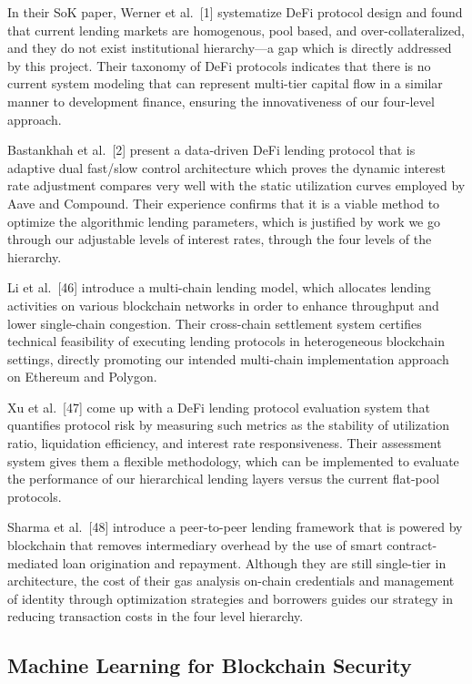 \documentclass[12pt,a4paper]{report}
\begin{document}
In their SoK paper, Werner et al.~[1] systematize DeFi protocol design and found that current lending markets are homogenous, pool based, and over-collateralized, and they do not exist institutional hierarchy---a gap which is directly addressed by this project. Their taxonomy of DeFi protocols indicates that there is no current system modeling that can represent multi-tier capital flow in a similar manner to development finance, ensuring the innovativeness of our four-level approach.

Bastankhah et al.~[2] present a data-driven DeFi lending protocol that is adaptive dual fast/slow control architecture which proves the dynamic interest rate adjustment compares very well with the static utilization curves employed by Aave and Compound. Their experience confirms that it is a viable method to optimize the algorithmic lending parameters, which is justified by work we go through our adjustable levels of interest rates, through the four levels of the hierarchy.

Li et al.~[46] introduce a multi-chain lending model, which allocates lending activities on various blockchain networks in order to enhance throughput and lower single-chain congestion. Their cross-chain settlement system certifies technical feasibility of executing lending protocols in heterogeneous blockchain settings, directly promoting our intended multi-chain implementation approach on Ethereum and Polygon.

Xu et al.~[47] come up with a DeFi lending protocol evaluation system that quantifies protocol risk by measuring such metrics as the stability of utilization ratio, liquidation efficiency, and interest rate responsiveness. Their assessment system gives them a flexible methodology, which can be implemented to evaluate the performance of our hierarchical lending layers versus the current flat-pool protocols.

Sharma et al.~[48] introduce a peer-to-peer lending framework that is powered by blockchain that removes intermediary overhead by the use of smart contract-mediated loan origination and repayment. Although they are still single-tier in architecture, the cost of their gas analysis on-chain credentials and management of identity through optimization strategies and borrowers guides our strategy in reducing transaction costs in the four level hierarchy.

\subsection{Machine Learning for Blockchain Security}
\end{document}
